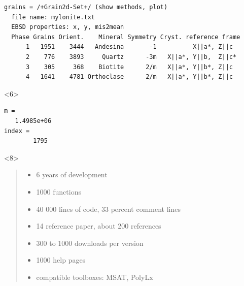 \documentclass[comptress]{beamer}
\begin{document}
\begin{frame}[fragile]
\begin{overlayarea}{\textwidth}{5cm}
\begin{onlyenv}
\begin{lstlisting}[style=output]
grains = /+Grain2d-Set+/ (show methods, plot)
  file name: mylonite.txt
  EBSD properties: x, y, mis2mean
  Phase Grains Orient.    Mineral Symmetry Cryst. reference frame
      1   1951    3444   Andesina       -1          X||a*, Z||c
      2    776    3893     Quartz      -3m   X||a*, Y||b,  Z||c*
      3    305     368    Biotite      2/m   X||a*, Y||b*, Z||c
      4   1641    4781 Orthoclase      2/m   X||a*, Y||b*, Z||c
  \end{lstlisting}
\end{onlyenv}
\begin{onlyenv}<6>
\begin{lstlisting}[style=output]
m =
   1.4985e+06
index =
        1795
\end{lstlisting}
\end{onlyenv}

\begin{onlyenv}<8>
  \begin{quote}
  \begin{itemize}
    \item 6 years of development
    \item 1000 functions
    \item 40 000 lines of code, 33 percent comment lines
    \item 14 reference paper, about 200 references
    \item 300 to 1000 downloads per version
    \item 1000 help pages
    \item compatible toolboxes: MSAT, PolyLx
  \end{itemize}
  \end{quote}
\end{onlyenv}



\end{overlayarea}
\end{frame}
\end{document}
